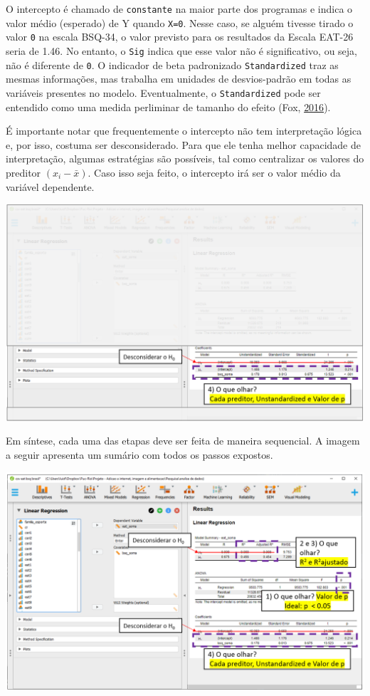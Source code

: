 \documentclass[
]{book}
\begin{document}
O intercepto é chamado de \texttt{constante} na maior parte dos
programas e indica o valor médio (esperado) de Y quando \texttt{X=0}.
Nesse caso, se alguém tivesse tirado o valor \texttt{0} na escala
BSQ-34, o valor previsto para os resultados da Escala EAT-26 seria de
1.46. No entanto, o \texttt{Sig} indica que esse valor não é
significativo, ou seja, não é diferente de \texttt{0}. O indicador de
beta padronizado \texttt{Standardized} traz as mesmas informações, mas
trabalha em unidades de desvios-padrão em todas as variáveis presentes
no modelo. Eventualmente, o \texttt{Standardized} pode ser entendido
como uma medida perliminar de tamanho do efeito (Fox,
\protect\hyperlink{ref-fox2016}{2016}).

É importante notar que frequentemente o intercepto não tem interpretação
lógica e, por isso, costuma ser desconsiderado. Para que ele tenha
melhor capacidade de interpretação, algumas estratégias são possíveis,
tal como centralizar os valores do preditor \((x_i-\bar{x})\). Caso isso
seja feito, o intercepto irá ser o valor médio da variável dependente.

\includegraphics{./img/cap_reg_resultados4.png}

Em síntese, cada uma das etapas deve ser feita de maneira sequencial. A
imagem a seguir apresenta um sumário com todos os passos expostos.

\includegraphics{./img/cap_reg_resultados_juntos.png}
\end{document}
